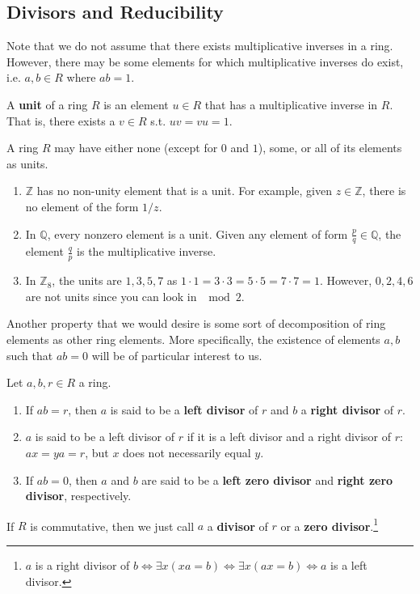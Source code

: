 \subsection{Divisors and Reducibility} 

  Note that we do not assume that there exists multiplicative inverses in a ring. However, there may be some elements for which multiplicative inverses do exist, i.e. $a, b \in R$ where $ab = 1$. 

  \begin{definition}[Unit]
    A \textbf{unit} of a ring $R$ is an element $u \in R$ that has a multiplicative inverse in $R$. That is, there exists a $v \in R$ s.t. $uv = vu = 1$. 
  \end{definition}

  \begin{example}
    A ring $R$ may have either none (except for $0$ and $1$), some, or all of its elements as units. 
    \begin{enumerate}
      \item $\mathbb{Z}$ has no non-unity element that is a unit. For example, given $z \in \mathbb{Z}$, there is no element of the form $1/z$.  
      \item In $\mathbb{Q}$, every nonzero element is a unit. Given any element of form $\frac{p}{q} \in \mathbb{Q}$, the element $\frac{q}{p}$ is the multiplicative inverse. 
      \item In $\mathbb{Z}_8$, the units are $1, 3, 5, 7$ as $1 \cdot 1 = 3 \cdot 3 = 5 \cdot 5 = 7 \cdot 7 = 1$. However, $0, 2, 4, 6$ are not units since you can look in $\mod{2}$. 
    \end{enumerate}
  \end{example}

  Another property that we would desire is some sort of decomposition of ring elements as other ring elements. More specifically, the existence of elements $a, b$ such that $ab = 0$ will be of particular interest to us. 

  \begin{definition}
    Let $a, b, r \in R$ a ring. 
    \begin{enumerate}
      \item If $ab = r$, then $a$ is said to be a \textbf{left divisor} of $r$ and $b$ a \textbf{right divisor} of $r$. 

      \item $a$ is said to be a left divisor of $r$ if it is a left divisor and a right divisor of $r$: $ax = ya = r$, but $x$ does not necessarily equal $y$. 

      \item If $ab = 0$, then $a$ and $b$ are said to be a \textbf{left zero divisor} and \textbf{right zero divisor}, respectively. 
    \end{enumerate}
    If $R$ is commutative, then we just call $a$ a \textbf{divisor} of $r$ or a \textbf{zero divisor}.\footnote{$a$ is a right divisor of $b \iff \exists x (xa = b) \iff \exists x (ax = b) \iff a$ is a left divisor. } 
  \end{definition}

